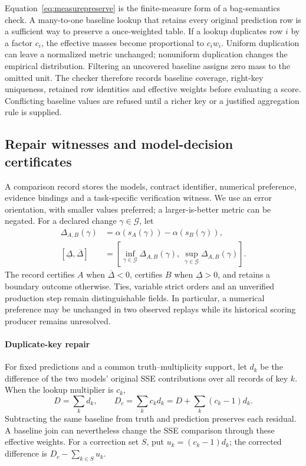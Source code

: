 Equation~\eqref{eq:measurepreserve} is the finite-measure form of a bag-semantics check. A many-to-one baseline lookup that retains every original prediction row is a sufficient way to preserve a once-weighted table. If a lookup duplicates row $i$ by a factor $c_i$, the effective masses become proportional to $c_iw_i$. Uniform duplication can leave a normalized metric unchanged; nonuniform duplication changes the empirical distribution. Filtering an uncovered baseline assigns zero mass to the omitted unit. The checker therefore records baseline coverage, right-key uniqueness, retained row identities and effective weights before evaluating a score. Conflicting baseline values are refused until a richer key or a justified aggregation rule is supplied.

\subsection{Repair witnesses and model-decision certificates}\label{subsec:decisioncert}
A comparison record stores the models, contract identifier, numerical preference, evidence bindings and a task-specific verification witness. We use an error orientation, with smaller values preferred; a larger-is-better metric can be negated. For a declared change $\gamma\in\mathcal G$, let
\begin{equation}\label{eq:generaldecision}
\begin{aligned}
\Delta_{A,B}(\gamma)&=\alpha\!\left(s_A(\gamma)\right)-\alpha\!\left(s_B(\gamma)\right),\\
[\underline\Delta,\overline\Delta]&=\left[\inf_{\gamma\in\mathcal G}\Delta_{A,B}(\gamma),\ \sup_{\gamma\in\mathcal G}\Delta_{A,B}(\gamma)\right].
\end{aligned}
\end{equation}
The record certifies $A$ when $\overline\Delta<0$, certifies $B$ when $\underline\Delta>0$, and retains a boundary outcome otherwise. Ties, variable strict orders and an unverified production step remain distinguishable fields. In particular, a numerical preference may be unchanged in two observed replays while its historical scoring producer remains unresolved.

\paragraph{Duplicate-key repair}
For fixed predictions and a common truth--multiplicity support, let $d_k$ be the difference of the two models' original SSE contributions over all records of key $k$. When the lookup multiplier is $c_k$,
\begin{equation}\label{eq:joinshift}
D=\sum_kd_k,\qquad D_c=\sum_kc_kd_k
 =D+\sum_k(c_k-1)d_k.
\end{equation}
Subtracting the same baseline from truth and prediction preserves each residual. A baseline join can nevertheless change the SSE comparison through these effective weights. For a correction set $S$, put $u_k=(c_k-1)d_k$; the corrected difference is $D_c-\sum_{k\in S}u_k$.

